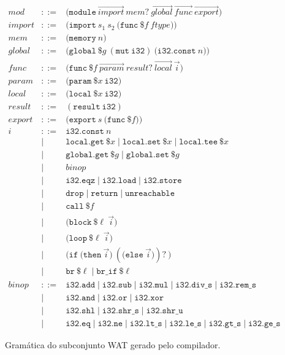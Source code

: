 \begin{figure}[htbp]
\[
\begin{array}{lcll}
  \mathit{mod}  &::=& \mathtt{(module}\ \vec{\mathit{import}}\ \mathit{mem}?\ \vec{\mathit{global}}\ \vec{\mathit{func}}\ \vec{\mathit{export}}\mathtt{)} \\[4pt]
  \mathit{import} &::=& \mathtt{(import}\ s_1\ s_2\ \mathtt{(func}\ \$f\ \mathit{ftype}\mathtt{))} \\
  \mathit{mem}   &::=& \mathtt{(memory}\ n\mathtt{)} \\
  \mathit{global} &::=& \mathtt{(global}\ \$g\ \mathtt{(mut\ i32)}\ \mathtt{(i32.const}\ n\mathtt{))} \\
  \mathit{func}  &::=& \mathtt{(func}\ \$f\ \vec{\mathit{param}}\ \mathit{result}?\ \vec{\mathit{local}}\ \vec{i}\mathtt{)} \\
  \mathit{param} &::=& \mathtt{(param}\ \$x\ \mathtt{i32)} \\
  \mathit{local} &::=& \mathtt{(local}\ \$x\ \mathtt{i32)} \\
  \mathit{result} &::=& \mathtt{(result\ i32)} \\
  \mathit{export} &::=& \mathtt{(export}\ s\ \mathtt{(func}\ \$f\mathtt{))} \\[4pt]
  i &::=& \mathtt{i32.const}\ n \\
    &\mid& \mathtt{local.get}\ \$x \mid \mathtt{local.set}\ \$x \mid \mathtt{local.tee}\ \$x \\
    &\mid& \mathtt{global.get}\ \$g \mid \mathtt{global.set}\ \$g \\
    &\mid& \mathit{binop} \\
    &\mid& \mathtt{i32.eqz} \mid \mathtt{i32.load} \mid \mathtt{i32.store} \\
    &\mid& \mathtt{drop} \mid \mathtt{return} \mid \mathtt{unreachable} \\
    &\mid& \mathtt{call}\ \$f \\
    &\mid& \mathtt{(block}\ \$\ell\ \vec{i}\mathtt{)} \\
    &\mid& \mathtt{(loop}\ \$\ell\ \vec{i}\mathtt{)} \\
    &\mid& \mathtt{(if}\ \mathtt{(then}\ \vec{i}\mathtt{)}\ (\mathtt{(else}\ \vec{i}\mathtt{)})?\ \mathtt{)} \\
    &\mid& \mathtt{br}\ \$\ell \mid \mathtt{br\_if}\ \$\ell \\[4pt]
  \mathit{binop} &::=& \mathtt{i32.add} \mid \mathtt{i32.sub} \mid \mathtt{i32.mul}
                     \mid \mathtt{i32.div\_s} \mid \mathtt{i32.rem\_s} \\
    &\mid& \mathtt{i32.and} \mid \mathtt{i32.or} \mid \mathtt{i32.xor} \\
    &\mid& \mathtt{i32.shl} \mid \mathtt{i32.shr\_s} \mid \mathtt{i32.shr\_u} \\
    &\mid& \mathtt{i32.eq} \mid \mathtt{i32.ne}
         \mid \mathtt{i32.lt\_s} \mid \mathtt{i32.le\_s}
         \mid \mathtt{i32.gt\_s} \mid \mathtt{i32.ge\_s}
\end{array}
\]
\caption{Gramática do subconjunto WAT gerado pelo compilador.}\label{fig:wat-grammar}
\end{figure}

